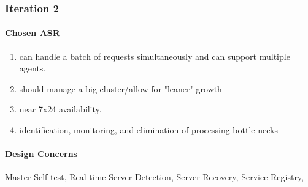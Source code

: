 \documentclass{article}
\begin{document}


		\subsubsection{Iteration 2}

		\paragraph{Chosen ASR}
		\begin{enumerate}
		\item can handle a batch of requests simultaneously and can support multiple agents.
		\item should manage a big cluster/allow for "leaner" growth
		\item near 7x24 availability.
		\item identification, monitoring, and elimination of processing bottle-necks
		\end{enumerate}
		\paragraph{Design Concerns}
		Master Self-test,
		Real-time Server Detection,
		Server Recovery,
		Service Registry,
\end{document}
